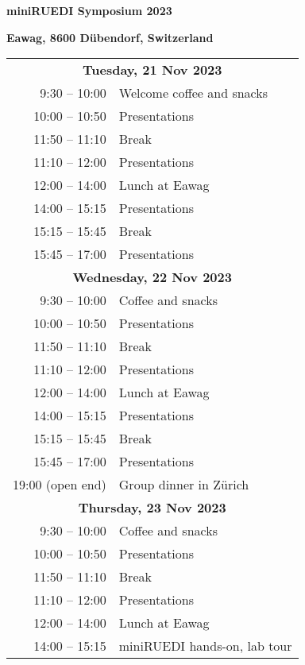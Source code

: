 \documentclass[12pt]{extbook}
\begin{document}
\thispagestyle{empty}
\begin{center}

{\LARGE \bf miniRUEDI Symposium 2023}

\bigskip
\bigskip
\bigskip

{\large \bf Eawag, 8600 Dübendorf, Switzerland}

\bigskip
\bigskip
\bigskip
\bigskip
\bigskip
\bigskip

\begin{tabular}{r@{\hskip 0.5in}l}

\multicolumn{2}{c}{\bf Tuesday, 21 Nov 2023}\\[2ex]
9:30  -- 10:00	&	Welcome coffee and snacks\\
10:00 -- 10:50	&	Presentations\\
11:50 -- 11:10	&	Break\\
11:10 -- 12:00	& Presentations\\
12:00 -- 14:00	&	Lunch at Eawag\\
14:00 -- 15:15	&	Presentations\\
15:15 -- 15:45	&	Break\\
15:45 -- 17:00	&	Presentations\\[8ex]

\multicolumn{2}{c}{\bf Wednesday, 22 Nov 2023}\\[2ex]
9:30  -- 10:00	&	Coffee and snacks\\
10:00 -- 10:50	&	Presentations\\
11:50 -- 11:10	&	Break\\
11:10 -- 12:00	& Presentations\\
12:00 -- 14:00	&	Lunch at Eawag\\
14:00 -- 15:15	&	Presentations\\
15:15 -- 15:45	&	Break\\
15:45 -- 17:00	&	Presentations\\
19:00 (open end)	&	Group dinner in Zürich\\[8ex]

\multicolumn{2}{c}{\bf Thursday, 23 Nov 2023}\\[2ex]
9:30  -- 10:00	&	Coffee and snacks\\
10:00 -- 10:50	&	Presentations\\
11:50 -- 11:10	&	Break\\
11:10 -- 12:00	& Presentations\\
12:00 -- 14:00	&	Lunch at Eawag\\
14:00 -- 15:15	&	miniRUEDI hands-on, lab tour\\[1.5ex]

\end{tabular}

\end{center}
\end{document}

